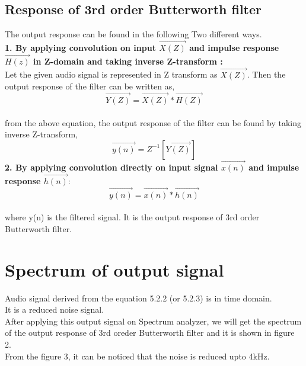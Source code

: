 \documentclass[journal,10pt,twocolumn]{article}
\begin{document}
\begin{flushleft}
\subsection{Response of 3rd order Butterworth filter}
\vspace{0.2cm}
The output response can be found in the following Two different ways.\\
\vspace{0.5cm}
\textbf{1. By applying convolution on input $\vec{X(Z)}$ and impulse response $\vec{H(z)}$ in Z-domain and taking inverse Z-transform :} \\
\vspace{0.2cm}
Let the given audio signal is represented in Z transform as $\vec{X(Z)}$.
Then the output response of the filter can be written as,\\
\begin{equation}
\vec{Y(Z)}= \vec{X(Z)} * \vec{H(Z)}
\end{equation}\\
\vspace{0.2cm}
from the above equation, the output response of the filter can be found by taking inverse Z-transform,
\begin{equation}
\vec{y(n)}= Z^{-1}[\vec{Y(Z)}]
\end{equation}
\vspace{0.2cm}
\textbf{2. By applying convolution directly on input signal $\vec{x(n)}$ and impulse response $\vec{h(n)}:$}\\

\vspace{0.25cm}
\begin{equation}
    \vec{y(n)} = \vec{x(n)}*\vec{h(n)}
\end{equation}\\

where y(n) is the filtered signal. It is the output response of 3rd order Butterworth filter.\\
\vspace{0.3cm}
\section{Spectrum of output signal}
\vspace{0.5cm}
Audio signal derived from the equation 5.2.2 (or 5.2.3) is in time domain.\\
It is a reduced noise signal.\\
\vspace{0.2cm}
After applying this output signal on Spectrum analyzer, we will get the spectrum of the output response of 3rd oreder Butterworth filter and it is shown in figure 2.\\
\vspace{0.2cm}
From the figure 3, it can be noticed that the noise is reduced upto 4kHz.\\
\end{flushleft}
\end{document}
